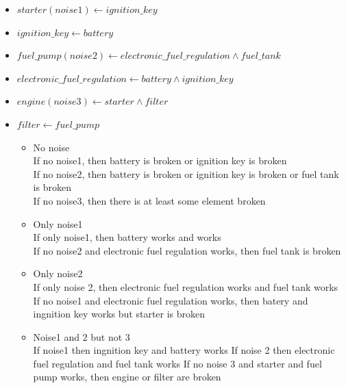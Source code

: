 \documentclass[paper=a4, fontsize=11pt]{scrartcl} %
\numberwithin{equation}{section} %
\numberwithin{figure}{section} %
\numberwithin{table}{section} %
\begin{document}
\begin{itemize}

	\item $ starter(noise1) \leftarrow ignition\_key $
	\item $ ignition\_key \leftarrow battery $
	
	\item $ fuel\_pump(noise2) \leftarrow electronic\_fuel\_regulation \land fuel\_tank $					
	\item $ electronic\_fuel\_regulation \leftarrow battery \land ignition\_key $
			

	\item $ engine(noise3) \leftarrow starter \land filter $
	\item $ filter \leftarrow fuel\_pump $
	

	
		\begin{itemize}
			\item No noise\\
				If no noise1, then battery is broken or ignition key is broken\\
				If no noise2, then battery is broken or ignition key is broken or fuel tank is broken\\
				If no noise3, then there is at least some element broken\\
			\item Only noise1\\
				If only noise1, then battery works and works\\
				If no noise2 and electronic fuel regulation works, then fuel tank is broken\\
				
			\item Only noise2\\	
				If only noise 2, then electronic fuel regulation works and fuel tank works
				If no noise1 and electronic fuel regulation works, then batery and ingnition key works but starter is broken
			\item Noise1 and 2 but not 3\\
				If noise1 then ingnition key and battery works
				If noise 2 then electronic fuel regulation and fuel tank works 
				If no noise 3 and starter and fuel pump works, then engine or filter are broken
			
			
		\end{itemize}

\end{itemize}






\end{document}

